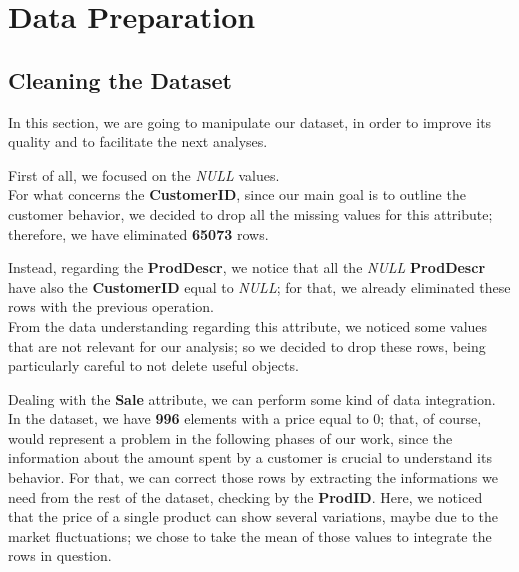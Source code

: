 \section{Data Preparation}

\subsection{Cleaning the Dataset}
In this section, we are going to manipulate our dataset, in order to improve its quality and to facilitate the next analyses.

First of all, we focused on the \emph{NULL} values.\\
For what concerns the \textbf{CustomerID}, since our main goal is to outline the customer behavior, we decided to drop all the missing values for this attribute; therefore, we have eliminated \textbf{65073} rows.

Instead, regarding the \textbf{ProdDescr}, we notice that all the \emph{NULL} \textbf{ProdDescr} have also the \textbf{CustomerID} equal to \emph{NULL}; for that, we already eliminated these rows with the previous operation.\\ 
From the data understanding regarding this attribute, we noticed some values that are not relevant for our analysis; so we decided to drop these rows, being particularly careful to not delete useful objects.

Dealing with the \textbf{Sale} attribute, we can perform some kind of data integration.\\
In the dataset, we have \textbf{996} elements with a price equal to 0; that, of course, would represent a problem in the following phases of our work, since the information about the amount spent by a customer is crucial to understand its behavior. For that, we can correct those rows by extracting the informations we need from the rest of the dataset, checking by the \textbf{ProdID}. Here, we noticed that the price of a single product can show several variations, maybe due to the market fluctuations; we chose to take the mean of those values to integrate the rows in question.

